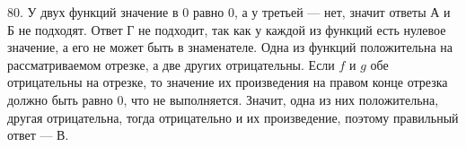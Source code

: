 80. У двух функций значение в 0 равно 0, а у третьей --- нет, значит ответы А и Б не подходят. Ответ Г не подходит, так как у каждой из функций есть нулевое значение, а его не может быть в знаменателе. Одна из функций положительна на рассматриваемом отрезке, а две других отрицательны. Если $f$ и $g$ обе отрицательны на отрезке, то значение их произведения на правом конце отрезка должно быть равно 0, что не выполняется. Значит, одна из них положительна, другая отрицательна, тогда отрицательно и их произведение, поэтому правильный ответ --- В.\\
